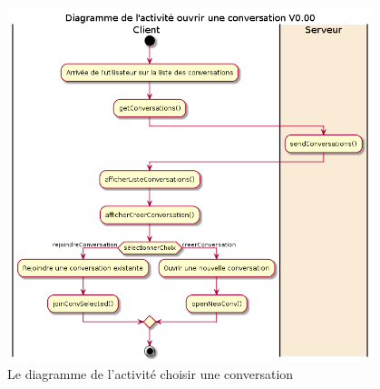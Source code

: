 \documentclass[11pt,dvipsnames,svgnames]{report}
\begin{document}
\begin{figure}[H]
\centerline{\includegraphics[width=0.95\textwidth]{diagrammes/activity-convList-diag.png}}
\caption{Le diagramme de l'activité \og choisir une conversation \fg}
\end{figure}
\end{document}
